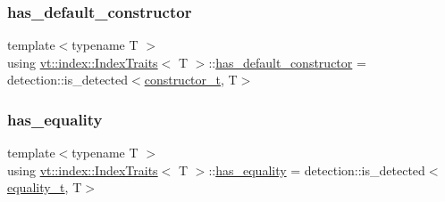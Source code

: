 \mbox{\label{structvt_1_1index_1_1_index_traits_a583c6d370e78ca2c8b9fc67bd2d1d942}} 
\subsubsection{\texorpdfstring{has\+\_\+default\+\_\+constructor}{has\_default\_constructor}}
{\footnotesize\ttfamily template$<$typename T $>$ \\
using \hyperlink{structvt_1_1index_1_1_index_traits}{vt\+::index\+::\+Index\+Traits}$<$ T $>$\+::\hyperlink{structvt_1_1index_1_1_index_traits_a583c6d370e78ca2c8b9fc67bd2d1d942}{has\+\_\+default\+\_\+constructor} =  detection\+::is\+\_\+detected$<$\hyperlink{structvt_1_1index_1_1_index_traits_a752bed91b021dff94a5b2863442e07c9}{constructor\+\_\+t}, T$>$}

\mbox{\label{structvt_1_1index_1_1_index_traits_abd8f9e796291242c027dd33d9a21acab}} 
\subsubsection{\texorpdfstring{has\+\_\+equality}{has\_equality}}
{\footnotesize\ttfamily template$<$typename T $>$ \\
using \hyperlink{structvt_1_1index_1_1_index_traits}{vt\+::index\+::\+Index\+Traits}$<$ T $>$\+::\hyperlink{structvt_1_1index_1_1_index_traits_abd8f9e796291242c027dd33d9a21acab}{has\+\_\+equality} =  detection\+::is\+\_\+detected$<$\hyperlink{structvt_1_1index_1_1_index_traits_a87c63bbffab452de516eb2dbc93c07e3}{equality\+\_\+t}, T$>$}

\mbox{\label{structvt_1_1index_1_1_index_traits_ae82fe931c4bbe8201d4dc72f07ceb42d}} 
